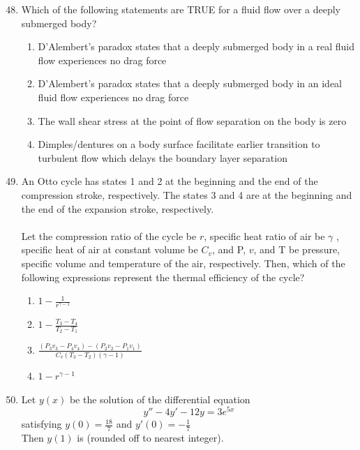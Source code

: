 \documentclass[journal]{IEEEtran}
\theoremstyle{remark}
\begin{document}
\begin{enumerate}[itemsep=1em]
\setcounter{enumi}{47}
\item Which of the following statements are TRUE for a fluid flow over a deeply submerged body?
\begin{enumerate}[leftmargin=2.5em, labelsep=0.5em, itemsep=0.5em]
    \item D'Alembert's paradox states that a deeply submerged body in a real fluid flow experiences no drag force
    \item D'Alembert's paradox states that a deeply submerged body in an ideal fluid flow experiences no drag force 
    \item The wall shear stress at the point of flow separation on the body is zero 
    \item Dimples/dentures on a body surface facilitate earlier transition to turbulent flow which delays the boundary layer separation 
\end{enumerate}
\end{enumerate}

\begin{enumerate}[itemsep=1em]
\setcounter{enumi}{48}
\item An Otto cycle has states 1 and 2 at the beginning and the end of the compression stroke, respectively. The states 3 and 4 are at the beginning and the end of the expansion stroke, respectively. \\
\\
Let the compression ratio of the cycle be $r$, specific heat ratio of air be $\gamma$ , specific heat of air at constant volume be $C_v$,  and  P, $v$,  and T be pressure, specific volume and temperature of the air, respectively.  Then, which of the following expressions represent the thermal efficiency of the cycle? 
\begin{enumerate}[leftmargin=2.5em, labelsep=0.5em, itemsep=0.5em]
    \item $1-\frac{1}{r^{\gamma -1}}$
    \item $1-\frac{T_3-T_4}{T_2-T_1}$
    \item $\frac{(P_3v_3-P_4v_4)-(P_2v_2-P_1v_1)}{C_v(T_3-T_2)(\gamma -1)}$
    \item $1-r^{\gamma-1}$
\end{enumerate}
\end{enumerate}
\newpage
\vspace*{0.25cm}
\begin{enumerate}[itemsep=1em]
\setcounter{enumi}{49}
\item Let $y(x)$ be the solution of the differential equation  
\[
y''-4y'-12y=3e^{5x}
\]
satisfying $y(0)=\frac{18}{7}$ and $y'(0)=-\frac{1}{7}$\\
Then $y(1)$ is \underline{\hspace{1cm}} (rounded off to nearest integer). 
\end{enumerate}
\end{document}

